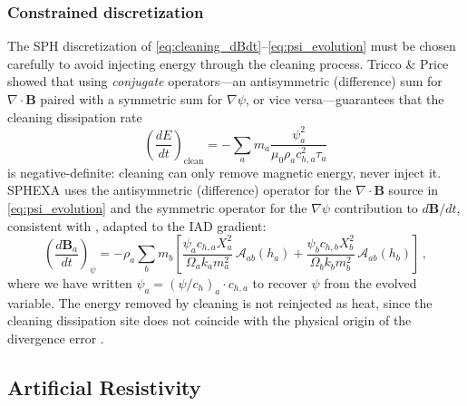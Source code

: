 \subsubsection*{Constrained discretization}

The SPH discretization of \eqref{eq:cleaning_dBdt}--\eqref{eq:psi_evolution} must be chosen carefully to avoid injecting energy through the cleaning process. Tricco \& Price \cite{TriccoPrice2012} showed that using \emph{conjugate} operators---an antisymmetric (difference) sum for $\nabla \cdot \mathbf{B}$ paired with a symmetric sum for $\nabla \psi$, or vice versa---guarantees that the cleaning dissipation rate
\begin{equation}
    \left(\frac{dE}{dt}\right)_\mathrm{clean} = -\sum_a m_a \frac{\psi_a^2}{\mu_0 \rho_a c_{h,a}^2 \tau_a}
    \label{eq:cleaning_dissipation}
\end{equation}
is negative-definite: cleaning can only remove magnetic energy, never inject it. SPHEXA uses the antisymmetric (difference) operator for the $\nabla \cdot \mathbf{B}$ source in \eqref{eq:psi_evolution} and the symmetric operator for the $\nabla \psi$ contribution to $d\mathbf{B}/dt$, consistent with \cite{TriccoPrice2012}, adapted to the IAD gradient:
\begin{equation}
    \left(\frac{d\mathbf{B}_a}{dt}\right)_\psi = -\rho_a \sum_b m_b \left[\frac{\psi_a c_{h,a} X_a^2}{\Omega_a k_a m_a^2}\, \boldsymbol{\mathcal{A}}_{ab}(h_a) + \frac{\psi_b c_{h,b} X_b^2}{\Omega_b k_b m_b^2}\, \boldsymbol{\mathcal{A}}_{ab}(h_b)\right]\,,
    \label{eq:cleaning_grad_psi}
\end{equation}
where we have written $\psi_a = (\psi/c_h)_a \cdot c_{h,a}$ to recover $\psi$ from the evolved variable. The energy removed by cleaning is not reinjected as heat, since the cleaning dissipation site does not coincide with the physical origin of the divergence error \cite{TriccoPrice2012}.




\subsection{Artificial Resistivity}
\label{sec:ar}

